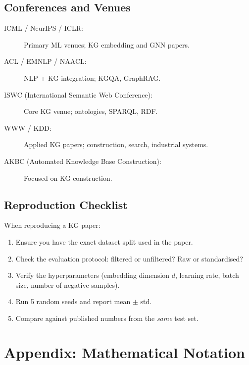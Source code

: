 \documentclass[11pt,a4paper,oneside,openany]{book}
\theoremstyle{definition}
\theoremstyle{plain}
\theoremstyle{remark}
\begin{document}
\section{Conferences and Venues}\label{sec:res-venues}

\begin{description}
	\item[ICML / NeurIPS / ICLR:] Primary ML venues; KG embedding and GNN papers.
	\item[ACL / EMNLP / NAACL:] NLP + KG integration; KGQA, GraphRAG.
	\item[ISWC (International Semantic Web Conference):] Core KG venue; ontologies, SPARQL, RDF.
	\item[WWW / KDD:] Applied KG papers; construction, search, industrial systems.
	\item[AKBC (Automated Knowledge Base Construction):] Focused on KG construction.
\end{description}

\section{Reproduction Checklist}\label{sec:res-checklist}

When reproducing a KG paper:
\begin{enumerate}
	\item Ensure you have the exact dataset split used in the paper.
	\item Check the evaluation protocol: filtered or unfiltered? Raw or standardised?
	\item Verify the hyperparameters (embedding dimension $d$, learning rate, batch size, number of negative samples).
	\item Run 5 random seeds and report mean $\pm$ std.
	\item Compare against published numbers from the \emph{same} test set.
\end{enumerate}

\appendix
\chapter{Appendix: Mathematical Notation}\label{app:notation}
\end{document}
